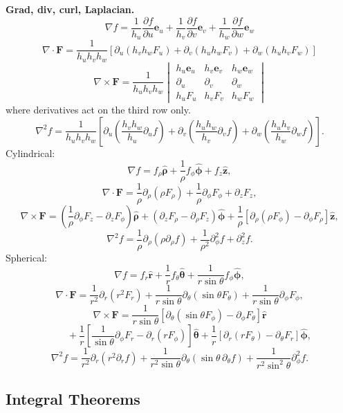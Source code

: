 \noindent\textbf{Grad, div, curl, Laplacian.}
\[
\boxed{\nabla f
=\frac1{h_u}\frac{\partial f}{\partial u}\mathbf{e}_u
+\frac1{h_v}\frac{\partial f}{\partial v}\mathbf{e}_v
+\frac1{h_w}\frac{\partial f}{\partial w}\mathbf{e}_w}
\]
\[
\boxed{\nabla\cdot\mathbf{F}
=\frac1{h_uh_vh_w}
\left[\partial_u(h_vh_wF_u)
+\partial_v(h_uh_wF_v)
+\partial_w(h_uh_vF_w)\right]}
\]
\[
\boxed{\nabla\times\mathbf{F}
=\frac1{h_uh_vh_w}
\begin{vmatrix}
h_u\mathbf{e}_u & h_v\mathbf{e}_v & h_w\mathbf{e}_w\\
\partial_u & \partial_v & \partial_w\\
h_uF_u & h_vF_v & h_wF_w
\end{vmatrix}}
\]
where derivatives act on the third row only.
\[
\boxed{\nabla^2f
=\frac1{h_uh_vh_w}
\left[
\partial_u\left(\frac{h_vh_w}{h_u}\partial_u f\right)
+\partial_v\left(\frac{h_uh_w}{h_v}\partial_v f\right)
+\partial_w\left(\frac{h_uh_v}{h_w}\partial_w f\right)
\right].}
\]
Cylindrical:
\[
\nabla f=f_\rho\hat{\bm{\rho}}+\frac1{\rho}f_\phi\hat{\bm{\phi}}+f_z\hat{\mathbf{z}},
\]
\[
\nabla\cdot\mathbf{F}
=\frac1{\rho}\partial_\rho(\rho F_\rho)
+\frac1{\rho}\partial_\phi F_\phi+\partial_zF_z,
\]
\[
\nabla\times\mathbf{F}
=\left(\frac1{\rho}\partial_\phi F_z-\partial_zF_\phi\right)\hat{\bm{\rho}}
+\left(\partial_zF_\rho-\partial_\rho F_z\right)\hat{\bm{\phi}}
+\frac1{\rho}\left[\partial_\rho(\rho F_\phi)-\partial_\phi F_\rho\right]\hat{\mathbf{z}},
\]
\[
\nabla^2f=
\frac1{\rho}\partial_\rho(\rho\partial_\rho f)
+\frac1{\rho^2}\partial_\phi^2f+\partial_z^2f.
\]
Spherical:
\[
\nabla f=f_r\hat{\mathbf{r}}+\frac1r f_\theta\hat{\bm{\theta}}
+\frac1{r\sin\theta}f_\phi\hat{\bm{\phi}},
\]
\[
\nabla\cdot\mathbf{F}
=\frac1{r^2}\partial_r(r^2F_r)
+\frac1{r\sin\theta}\partial_\theta(\sin\theta F_\theta)
+\frac1{r\sin\theta}\partial_\phi F_\phi,
\]
\[
\nabla\times\mathbf{F}
=\frac1{r\sin\theta}
\left[\partial_\theta(\sin\theta F_\phi)-\partial_\phi F_\theta\right]\hat{\mathbf{r}}
\]
\[
\hspace{2em}
+\frac1r\left[\frac1{\sin\theta}\partial_\phi F_r-\partial_r(rF_\phi)\right]\hat{\bm{\theta}}
+\frac1r\left[\partial_r(rF_\theta)-\partial_\theta F_r\right]\hat{\bm{\phi}},
\]
\[
\nabla^2f=
\frac1{r^2}\partial_r(r^2\partial_r f)
+\frac1{r^2\sin\theta}\partial_\theta(\sin\theta\,\partial_\theta f)
+\frac1{r^2\sin^2\theta}\partial_\phi^2f.
\]

\subsection{Integral Theorems}

